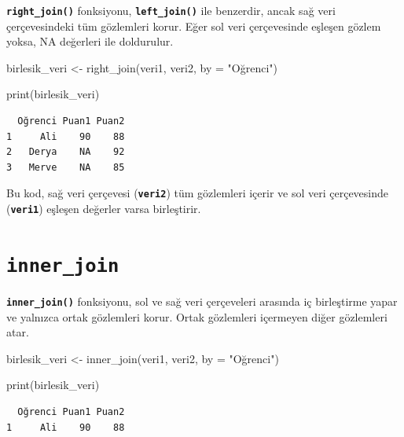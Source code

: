 \documentclass[
  letterpaper,
  DIV=11,
  numbers=noendperiod]{scrreprt}
\newenvironment{Shaded}{\begin{snugshade}}{\end{snugshade}}
\newcommand{\AttributeTok}[1]{\textcolor[rgb]{0.40,0.45,0.13}{#1}}
\newcommand{\FunctionTok}[1]{\textcolor[rgb]{0.28,0.35,0.67}{#1}}
\newcommand{\NormalTok}[1]{\textcolor[rgb]{0.00,0.23,0.31}{#1}}
\newcommand{\OtherTok}[1]{\textcolor[rgb]{0.00,0.23,0.31}{#1}}
\newcommand{\StringTok}[1]{\textcolor[rgb]{0.13,0.47,0.30}{#1}}
\begin{document}

\textbf{\texttt{right\_join()}} fonksiyonu,
\textbf{\texttt{left\_join()}} ile benzerdir, ancak sağ veri
çerçevesindeki tüm gözlemleri korur. Eğer sol veri çerçevesinde eşleşen
gözlem yoksa, NA değerleri ile doldurulur.

\begin{Shaded}
\begin{Highlighting}[]
\NormalTok{birlesik\_veri }\OtherTok{\textless{}{-}} \FunctionTok{right\_join}\NormalTok{(veri1, veri2, }\AttributeTok{by =} \StringTok{"Oğrenci"}\NormalTok{)}

\FunctionTok{print}\NormalTok{(birlesik\_veri)}
\end{Highlighting}
\end{Shaded}

\begin{verbatim}
  Oğrenci Puan1 Puan2
1     Ali    90    88
2   Derya    NA    92
3   Merve    NA    85
\end{verbatim}

Bu kod, sağ veri çerçevesi (\textbf{\texttt{veri2}}) tüm gözlemleri
içerir ve sol veri çerçevesinde (\textbf{\texttt{veri1}}) eşleşen
değerler varsa birleştirir.

\section*{\texorpdfstring{\textbf{\texttt{inner\_join}}}{inner\_join}}\label{inner_join}


\textbf{\texttt{inner\_join()}} fonksiyonu, sol ve sağ veri çerçeveleri
arasında iç birleştirme yapar ve yalnızca ortak gözlemleri korur. Ortak
gözlemleri içermeyen diğer gözlemleri atar.

\begin{Shaded}
\begin{Highlighting}[]
\NormalTok{birlesik\_veri }\OtherTok{\textless{}{-}} \FunctionTok{inner\_join}\NormalTok{(veri1, veri2, }\AttributeTok{by =} \StringTok{"Oğrenci"}\NormalTok{)}

\FunctionTok{print}\NormalTok{(birlesik\_veri)}
\end{Highlighting}
\end{Shaded}

\begin{verbatim}
  Oğrenci Puan1 Puan2
1     Ali    90    88
\end{verbatim}
\end{document}
